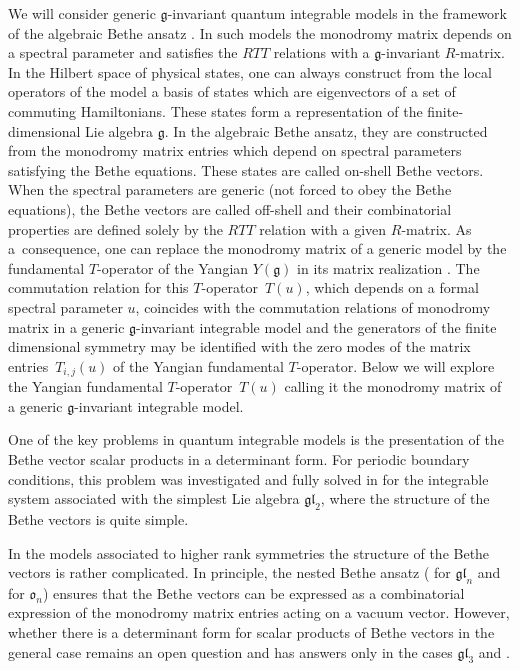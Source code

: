 \documentclass[10pt,a4paper]{amsart}
\theoremstyle{definition}
\begin{document}
We will consider generic $\mathfrak{g}$-invariant quantum integrable models
in the framework of the algebraic Bethe ansatz \cite{Fad96}. In such models the
monodromy matrix depends on a spectral parameter and satisfies the $RTT$ relations \cite{FRT} with a $\mathfrak{g}$-invariant
$R$-matrix. In the Hilbert space of physical states,
one can always construct from the local operators of the model a basis of states
 which are eigenvectors of a set of commuting Hamiltonians. These states form a representation of the finite-dimensional Lie
algebra $\mathfrak{g}$. In the algebraic
Bethe ansatz, they are constructed from the monodromy matrix entries
which depend on spectral parameters satisfying the Bethe equations.
These states are called on-shell Bethe vectors. When the spectral parameters
are generic (not forced to obey the Bethe equations), the Bethe vectors are called off-shell and their combinatorial properties
are defined solely by the $RTT$ relation with a given $R$-matrix.
As a~consequence, one can replace the monodromy matrix of a generic
model by the fundamental $T$-operator of the Yangian $Y(\mathfrak{g})$
in its matrix realization \cite{Drinfeld,Molev}.
The commutation relation for this $T$-operator~$T(u)$,
which depends on a formal spectral parameter $u$, coincides with
the commutation relations of monodromy matrix in a generic $\mathfrak{g}$-invariant
integrable model and the generators of the finite dimensional symmetry
may be identified with the zero modes of the matrix entries~$T_{i,j}(u)$
of the Yangian fundamental $T$-operator. Below we will explore the
Yangian fundamental $T$-operator~$T(u)$ calling it the monodromy
matrix of a generic $\mathfrak{g}$-invariant integrable model.


One of the key problems in quantum integrable models is the presentation
of the Bethe vector scalar products in a determinant form.
For periodic boundary conditions, this problem was
investigated and fully solved in \cite{S-Det89}
for the integrable system associated with the simplest Lie algebra $\mathfrak{gl}_2$,
where the structure of the Bethe vectors is quite simple.




In the models associated to higher rank symmetries the structure of the Bethe vectors
is rather complicated. In principle, the nested Bethe ansatz (\cite{KR1, KR2} for $\mathfrak{gl}_n$ and \cite{Res91} for $\mathfrak{o}_n$) ensures that the
Bethe vectors can be expressed as a combinatorial expression
of the monodromy matrix entries acting on a vacuum vector.
However, whether there is a determinant form for scalar products of Bethe vectors in the general case remains an open question and has answers only in the cases $\mathfrak{gl}_3$ \cite{BPRS12} and  \cite{HLPRS16}.
\end{document}
